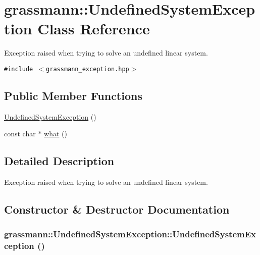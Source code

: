 \hypertarget{classgrassmann_1_1UndefinedSystemException}{
\section{grassmann::UndefinedSystemException Class Reference}
\label{classgrassmann_1_1UndefinedSystemException}
}
Exception raised when trying to solve an undefined linear system.  


{\tt \#include $<$grassmann\_\-exception.hpp$>$}

\subsection*{Public Member Functions}
\begin{CompactItemize}
\item 
\hyperlink{classgrassmann_1_1UndefinedSystemException_49bc0a7979db07f79413535926f5934e}{UndefinedSystemException} ()
\item 
const char $\ast$ \hyperlink{classgrassmann_1_1UndefinedSystemException_76a73a49fcec77afdb34d83c1e9b3916}{what} ()
\end{CompactItemize}


\subsection{Detailed Description}
Exception raised when trying to solve an undefined linear system. 

\subsection{Constructor \& Destructor Documentation}
\hypertarget{classgrassmann_1_1UndefinedSystemException_49bc0a7979db07f79413535926f5934e}{
\subsubsection[UndefinedSystemException]{\setlength{\rightskip}{0pt plus 5cm}grassmann::UndefinedSystemException::UndefinedSystemException ()}}
\label{classgrassmann_1_1UndefinedSystemException_49bc0a7979db07f79413535926f5934e}




